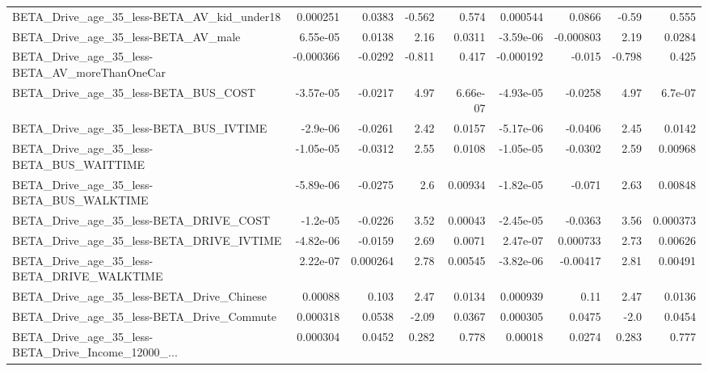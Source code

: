 \begin{tabular}{lrrrrrrrr}
BETA\_Drive\_age\_35\_less-BETA\_AV\_kid\_under18         &    0.000251 &       0.0383 &    -0.562 &    0.574 &   0.000544 &      0.0866 &        -0.59 &         0.555 \\
BETA\_Drive\_age\_35\_less-BETA\_AV\_male                &    6.55e-05 &       0.0138 &      2.16 &   0.0311 &  -3.59e-06 &   -0.000803 &         2.19 &        0.0284 \\
BETA\_Drive\_age\_35\_less-BETA\_AV\_moreThanOneCar      &   -0.000366 &      -0.0292 &    -0.811 &    0.417 &  -0.000192 &      -0.015 &       -0.798 &         0.425 \\
BETA\_Drive\_age\_35\_less-BETA\_BUS\_COST               &   -3.57e-05 &      -0.0217 &      4.97 & 6.66e-07 &  -4.93e-05 &     -0.0258 &         4.97 &       6.7e-07 \\
BETA\_Drive\_age\_35\_less-BETA\_BUS\_IVTIME             &    -2.9e-06 &      -0.0261 &      2.42 &   0.0157 &  -5.17e-06 &     -0.0406 &         2.45 &        0.0142 \\
BETA\_Drive\_age\_35\_less-BETA\_BUS\_WAITTIME           &   -1.05e-05 &      -0.0312 &      2.55 &   0.0108 &  -1.05e-05 &     -0.0302 &         2.59 &       0.00968 \\
BETA\_Drive\_age\_35\_less-BETA\_BUS\_WALKTIME           &   -5.89e-06 &      -0.0275 &       2.6 &  0.00934 &  -1.82e-05 &      -0.071 &         2.63 &       0.00848 \\
BETA\_Drive\_age\_35\_less-BETA\_DRIVE\_COST             &    -1.2e-05 &      -0.0226 &      3.52 &  0.00043 &  -2.45e-05 &     -0.0363 &         3.56 &      0.000373 \\
BETA\_Drive\_age\_35\_less-BETA\_DRIVE\_IVTIME           &   -4.82e-06 &      -0.0159 &      2.69 &   0.0071 &   2.47e-07 &    0.000733 &         2.73 &       0.00626 \\
BETA\_Drive\_age\_35\_less-BETA\_DRIVE\_WALKTIME         &    2.22e-07 &     0.000264 &      2.78 &  0.00545 &  -3.82e-06 &    -0.00417 &         2.81 &       0.00491 \\
BETA\_Drive\_age\_35\_less-BETA\_Drive\_Chinese          &     0.00088 &        0.103 &      2.47 &   0.0134 &   0.000939 &        0.11 &         2.47 &        0.0136 \\
BETA\_Drive\_age\_35\_less-BETA\_Drive\_Commute          &    0.000318 &       0.0538 &     -2.09 &   0.0367 &   0.000305 &      0.0475 &         -2.0 &        0.0454 \\
BETA\_Drive\_age\_35\_less-BETA\_Drive\_Income\_12000\_... &    0.000304 &       0.0452 &     0.282 &    0.778 &    0.00018 &      0.0274 &        0.283 &         0.777 \\

\end{tabular}
